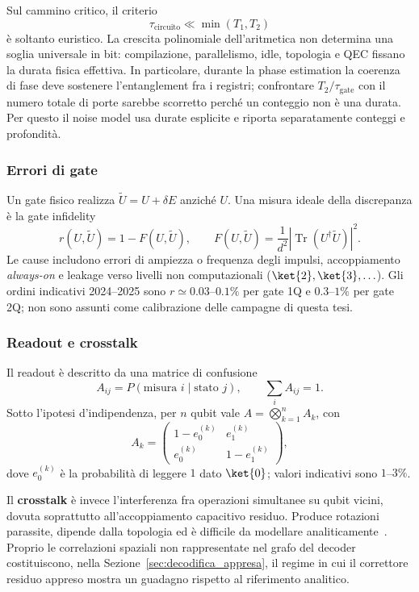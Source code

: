 Sul cammino critico, il criterio
\begin{equation}
    \tau_{\text{circuito}}\ll\min(T_1,T_2)
\end{equation}
è soltanto euristico. La crescita polinomiale dell'aritmetica non determina una
soglia universale in bit: compilazione, parallelismo, idle, topologia e QEC
fissano la durata fisica effettiva. In particolare, durante la phase estimation
la coerenza di fase deve sostenere l'entanglement fra i registri; confrontare
$T_2/\tau_{\text{gate}}$ con il numero totale di porte sarebbe scorretto perché
un conteggio non è una durata. Per questo il noise model usa durate esplicite e
riporta separatamente conteggi e profondità.

\subsubsection{Errori di gate}

Un gate fisico realizza $\widetilde U=U+\delta E$ anziché $U$. Una misura
ideale della discrepanza è la gate infidelity
\begin{equation}
 r(U,\widetilde U)=1-F(U,\widetilde U),\qquad
 F(U,\widetilde U)=\frac{1}{d^2}
 \left|\operatorname{Tr}(U^\dagger\widetilde U)\right|^2.
\end{equation}
Le cause includono errori di ampiezza o frequenza degli impulsi, accoppiamento
\emph{always-on} e leakage verso livelli non computazionali
($\ket{2},\ket{3},\ldots$). Gli ordini indicativi 2024--2025 sono
$r\simeq0.03$--$0.1\%$ per gate 1Q e $0.3$--$1\%$ per gate 2Q; non sono
assunti come calibrazione delle campagne di questa tesi.

\subsubsection{Readout e crosstalk}

Il readout è descritto da una matrice di confusione
\begin{equation}
 A_{ij}=P(\text{misura }i\mid\text{stato }j),\qquad
 \sum_iA_{ij}=1.
\end{equation}
Sotto l'ipotesi d'indipendenza, per $n$ qubit vale
$A=\bigotimes_{k=1}^nA_k$, con
\begin{equation}
 A_k=\begin{pmatrix}
 1-e_0^{(k)}&e_1^{(k)}\\ e_0^{(k)}&1-e_1^{(k)}
 \end{pmatrix},
\end{equation}
dove $e_0^{(k)}$ è la probabilità di leggere $1$ dato $\ket{0}$; valori
indicativi sono $1$--$3\%$.

Il \textbf{crosstalk} è invece l'interferenza fra operazioni simultanee su
qubit vicini, dovuta soprattutto all'accoppiamento capacitivo residuo. Produce
rotazioni parassite, dipende dalla topologia ed è difficile da modellare
analiticamente~\cite{sarovar2020}. Proprio le correlazioni spaziali non
rappresentate nel grafo del decoder costituiscono, nella
Sezione~\ref{sec:decodifica_appresa}, il regime in cui il correttore residuo
appreso mostra un guadagno rispetto al riferimento analitico.
